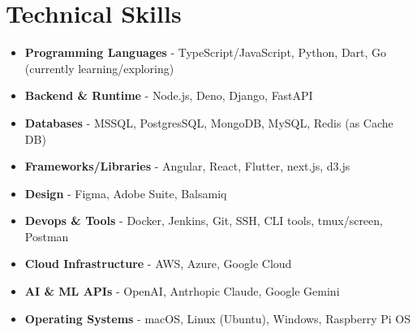 \section{Technical Skills}
\begin{itemize}[topsep=0pt, partopsep=0pt, itemsep=1pt, parsep=0pt]
	\item \textbf{Programming Languages} - TypeScript/JavaScript, Python, Dart, Go (currently learning/exploring)
	\item \textbf{Backend \& Runtime} - Node.js, Deno, Django, FastAPI
	\item \textbf{Databases} - MSSQL, PostgresSQL, MongoDB, MySQL, Redis (as Cache DB)
	\item \textbf{Frameworks/Libraries} - Angular, React, Flutter, next.js, d3.js
	\item \textbf{Design} - Figma, Adobe Suite, Balsamiq
	\item \textbf{Devops \& Tools} - Docker, Jenkins, Git, SSH, CLI tools, tmux/screen, Postman
	\item \textbf{Cloud Infrastructure} - AWS, Azure, Google Cloud
	\item \textbf{AI \& ML APIs} - OpenAI, Antrhopic Claude, Google Gemini
	\item \textbf{Operating Systems} - macOS, Linux (Ubuntu), Windows, Raspberry Pi OS
\end{itemize}